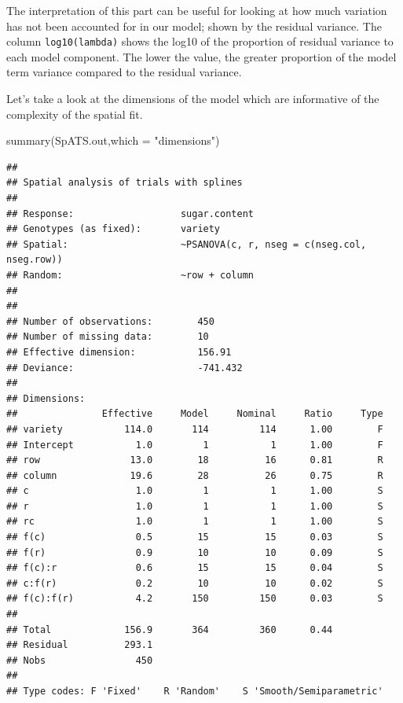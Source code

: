 \documentclass[
]{book}
\newenvironment{Shaded}{\begin{snugshade}}{\end{snugshade}}
\newcommand{\AttributeTok}[1]{\textcolor[rgb]{0.77,0.63,0.00}{#1}}
\newcommand{\FunctionTok}[1]{\textcolor[rgb]{0.00,0.00,0.00}{#1}}
\newcommand{\NormalTok}[1]{#1}
\newcommand{\StringTok}[1]{\textcolor[rgb]{0.31,0.60,0.02}{#1}}
\begin{document}
The interpretation of this part can be useful for looking at how much variation has not been accounted for in our model; shown by the residual variance. The column \texttt{log10(lambda)} shows the log10 of the proportion of residual variance to each model component. The lower the value, the greater proportion of the model term variance compared to the residual variance.

Let's take a look at the dimensions of the model which are informative of the complexity of the spatial fit.

\begin{Shaded}
\begin{Highlighting}[]
\FunctionTok{summary}\NormalTok{(SpATS.out,}\AttributeTok{which =} \StringTok{"dimensions"}\NormalTok{)}
\end{Highlighting}
\end{Shaded}

\begin{verbatim}
## 
## Spatial analysis of trials with splines 
## 
## Response:                   sugar.content
## Genotypes (as fixed):       variety   
## Spatial:                    ~PSANOVA(c, r, nseg = c(nseg.col, nseg.row))
## Random:                     ~row + column
## 
## 
## Number of observations:        450
## Number of missing data:        10
## Effective dimension:           156.91
## Deviance:                      -741.432
## 
## Dimensions:
##               Effective     Model     Nominal     Ratio     Type
## variety           114.0       114         114      1.00        F
## Intercept           1.0         1           1      1.00        F
## row                13.0        18          16      0.81        R
## column             19.6        28          26      0.75        R
## c                   1.0         1           1      1.00        S
## r                   1.0         1           1      1.00        S
## rc                  1.0         1           1      1.00        S
## f(c)                0.5        15          15      0.03        S
## f(r)                0.9        10          10      0.09        S
## f(c):r              0.6        15          15      0.04        S
## c:f(r)              0.2        10          10      0.02        S
## f(c):f(r)           4.2       150         150      0.03        S
##                                                                 
## Total             156.9       364         360      0.44         
## Residual          293.1                                         
## Nobs                450                                         
## 
## Type codes: F 'Fixed'    R 'Random'    S 'Smooth/Semiparametric'
\end{verbatim}
\end{document}
